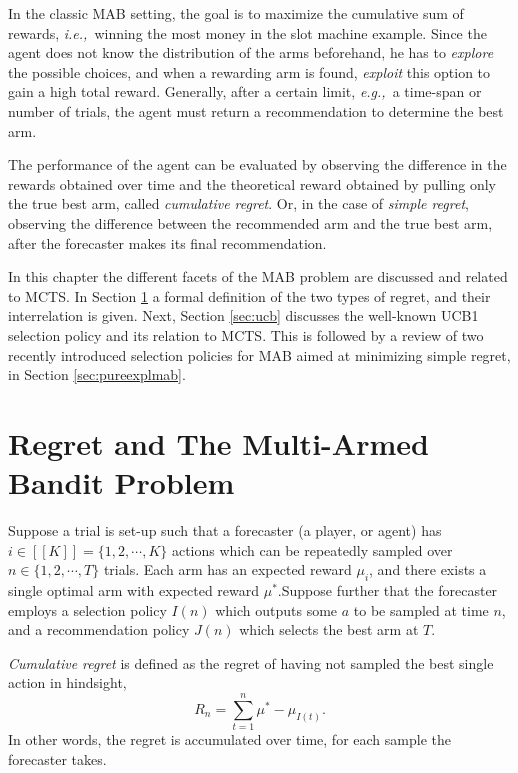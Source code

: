 \documentclass{kecsmstr}
\newcommand{\eg}{{\it e.g.,}~}
\newcommand{\ie}{{\it i.e.,}~}
\begin{document}
In the classic MAB setting, the goal is to maximize the cumulative sum of rewards, \ie winning the most money in the slot machine example. Since the agent does not know the distribution of the arms beforehand, he has to \emph{explore} the possible choices, and when a rewarding arm is found, \emph{exploit} this option to gain a high total reward. Generally, after a certain limit, \eg a time-span or number of trials, the agent must return a recommendation to determine the best arm.

The performance of the agent can be evaluated by observing the difference in the rewards obtained over time and the theoretical reward obtained by pulling only the true best arm, called \emph{cumulative regret}. Or, in the case of \emph{simple regret}, observing the difference between the recommended arm and the true best arm, after the forecaster makes its final recommendation.
\vspace{2 mm}

In this chapter the different facets of the MAB problem are discussed and related to MCTS. In Section \ref{sec:mabprob} a formal definition of the two types of regret, and their interrelation is given. Next, Section \ref{sec:ucb} discusses the well-known UCB1 selection policy and its relation to MCTS. This is followed by a review of two recently introduced selection policies for MAB aimed at minimizing simple regret, in Section \ref{sec:pureexplmab}.
\newpage
\section{Regret and The Multi-Armed Bandit Problem}
\label{sec:mabprob}
Suppose a trial is set-up such that a forecaster (a player, or agent) has $i \in [[K]] = \{ 1, 2, \cdots , K \}$ actions which can be repeatedly sampled over $n \in \{ 1, 2, \cdots, T \}$ trials. Each arm has an expected reward $\mu_i$, and there exists a single optimal arm with expected reward $\mu^*$.Suppose further that the forecaster employs a selection policy $I(n)$ which outputs some $a$ to be sampled at time $n$, and a recommendation policy $J(n)$ which selects the best arm at $T$.

\emph{Cumulative regret} is defined as the regret of having not sampled the best single action in hindsight, 
\begin{equation}
R_n = \sum_{t = 1}^{n}{\mu^* - \mu_{I(t)}}.
\end{equation}
In other words, the regret is accumulated over time, for each sample the forecaster takes.
\end{document}
